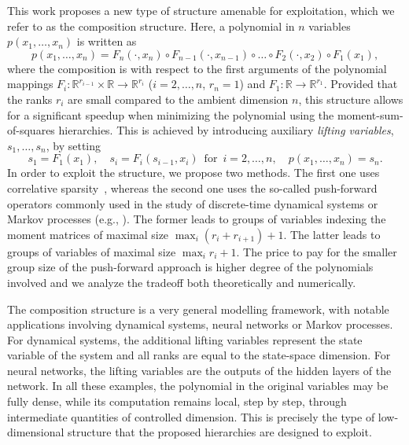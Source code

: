 \documentclass[11pt,a4paper]{article}
\newcommand{\R}{\mathbb R}
\theoremstyle{definition}
\begin{document}
This work proposes a new type of structure amenable for exploitation, which we refer to as the composition structure. Here, a polynomial in $n$ variables $p(x_1,\ldots,x_n)$ is written as
\[
p(x_1,\ldots,x_n) = F_n(\cdot,x_n)\circ F_{n-1}(\cdot,x_{n-1})\circ\ldots\circ F_2(\cdot,x_2)\circ F_1(x_1) ,
\] 
where the composition is with respect to the first arguments of the polynomial mappings $F_i: \R^{r_{i-1}}\times \R \to \R^{r_i}$ ($i = 2,\ldots,n$, $r_n=1$) and $F_1:\R\to\R^{r_1}$. Provided that the ranks $r_i$ are small compared to the ambient dimension $n$, this structure allows for a significant speedup when minimizing the polynomial using the moment-sum-of-squares hierarchies.  This is achieved by introducing auxiliary \emph{lifting variables}, $s_1,\ldots,s_n$, by setting 
\[
s_1=F_1(x_1),\quad s_i=F_i(s_{i-1},x_i)\, \text{ for }\, i=2,\dots,n, \quad p(x_1,\ldots,x_n) = s_n.
\]
In order to exploit the structure, we propose two methods. The first one uses correlative sparsity~\cite{Waki2006,Lasserre2006}, whereas the second one uses the so-called push-forward operators commonly used in the study of discrete-time dynamical systems or Markov processes (e.g., \cite{hernandez2012discrete}). The former leads to groups of variables indexing the moment matrices of maximal size $ \max_{i}(r_i + r_{i+1})+1$. The latter leads to groups of variables of maximal size  $ \max_{i}r_i  + 1$. The price to pay for the smaller group size of the push-forward approach is higher degree of the polynomials involved and we analyze the tradeoff both theoretically and numerically.

The composition structure is a very general modelling framework, with notable applications involving dynamical systems, neural networks or Markov processes. For dynamical systems, the additional lifting variables represent the state variable of the system and all ranks are equal to the state-space dimension. For neural networks, the lifting variables are the outputs of the hidden layers of the network. In all these examples, the polynomial in the original variables may be fully dense, while its computation remains local, step by step, through intermediate quantities of controlled dimension. This is precisely the type of low-dimensional structure that the proposed hierarchies are designed to exploit.
\end{document}
